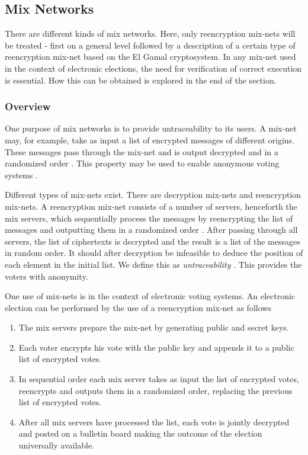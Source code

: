\subsection{Mix Networks}

There are different kinds of mix networks. Here, only reencryption
mix-nets will be treated - first on a general level followed by a
description of a certain type of reencryption mix-net based on the El
Gamal cryptosystem. In any mix-net used in the context of electronic
elections, the need for verification of correct execution is
essential. How this can be obtained is explored in the end of the
section.

\subsubsection{Overview}
One purpose of mix networks is to provide untraceability to its
users. A mix-net may, for example, take as input a list of encrypted
messages of different origins. These messages pass through the mix-net
and is output decrypted and in a randomized order \cite{mixnets}. This
property may be used to enable anonymous voting systems \cite{mixnets2}.

Different types of mix-nets exist. There are decryption mix-nets and
reencryption mix-nets. A reencryption mix-net consists of a number of
servers, henceforth the mix servers, which sequentially process the
messages by reencrypting the list of messages and outputting them in a
randomized order \cite{mixnets}. After passing through all servers,
the list of ciphertexts is decrypted and the result is a list of the
messages in random order. It should after decryption be infeasible to
deduce the position of each element in the initial list. We define
this as \emph{untraceability} \cite{mixnets2}. This provides the
voters with anonymity.

One use of mix-nets is in the context of electronic voting systems. An
electronic election can be performed by the use of a reencryption
mix-net as follows \cite{electronicvoting} \\
\begin{enumerate}
\item The mix servers prepare the mix-net by generating public and
  secret keys.
\item Each voter encrypts his vote with the public key and appends it
  to a public list of encrypted votes.
\item In sequential order each mix server takes as input the list of
  encrypted votes, reencrypts and outputs them in a randomized order,
  replacing the previous list of encrypted votes.
\item After all mix servers have processed the list, each vote is
  jointly decrypted and posted on a bulletin board making the outcome
  of the election universally available.
\end{enumerate}

